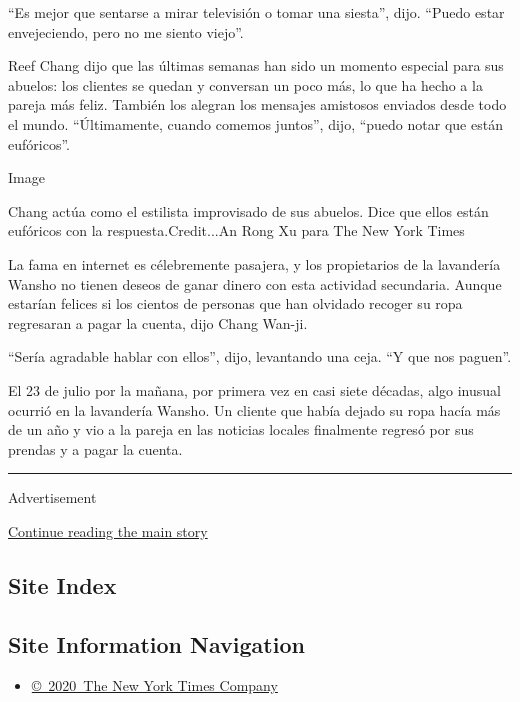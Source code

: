 ``Es mejor que sentarse a mirar televisión o tomar una siesta'', dijo.
``Puedo estar envejeciendo, pero no me siento viejo''.

Reef Chang dijo que las últimas semanas han sido un momento especial
para sus abuelos: los clientes se quedan y conversan un poco más, lo que
ha hecho a la pareja más feliz. También los alegran los mensajes
amistosos enviados desde todo el mundo. ``Últimamente, cuando comemos
juntos'', dijo, ``puedo notar que están eufóricos''.

Image

Chang actúa como el estilista improvisado de sus abuelos. Dice que ellos
están eufóricos con la respuesta.Credit...An Rong Xu para The New York
Times

La fama en internet es célebremente pasajera, y los propietarios de la
lavandería Wansho no tienen deseos de ganar dinero con esta actividad
secundaria. Aunque estarían felices si los cientos de personas que han
olvidado recoger su ropa regresaran a pagar la cuenta, dijo Chang
Wan-ji.

``Sería agradable hablar con ellos'', dijo, levantando una ceja. ``Y que
nos paguen''.

El 23 de julio por la mañana, por primera vez en casi siete décadas,
algo inusual ocurrió en la lavandería Wansho. Un cliente que había
dejado su ropa hacía más de un año y vio a la pareja en las noticias
locales finalmente regresó por sus prendas y a pagar la cuenta.

\begin{center}\rule{0.5\linewidth}{\linethickness}\end{center}

Advertisement

\protect\hyperlink{after-bottom}{Continue reading the main story}

\hypertarget{site-index}{%
\subsection{Site Index}\label{site-index}}

\hypertarget{site-information-navigation}{%
\subsection{Site Information
Navigation}\label{site-information-navigation}}

\begin{itemize}
\tightlist
\item
  \href{https://help.nytimes3xbfgragh.onion/hc/en-us/articles/115014792127-Copyright-notice}{©~2020~The
  New York Times Company}
\end{itemize}

